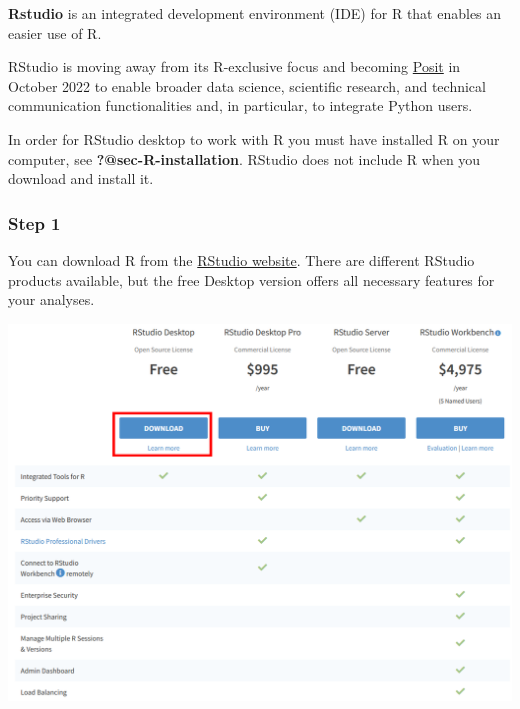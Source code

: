 \documentclass[
  letterpaper,
  DIV=11,
  numbers=noendperiod]{scrreprt}
\begin{document}
\textbf{Rstudio} is an integrated development environment (IDE) for R
that enables an easier use of R.

\begin{tcolorbox}[enhanced jigsaw, bottomtitle=1mm, title=\textcolor{quarto-callout-note-color}{\faInfo}\hspace{0.5em}{Note}, toptitle=1mm, toprule=.15mm, breakable, colframe=quarto-callout-note-color-frame, coltitle=black, rightrule=.15mm, arc=.35mm, left=2mm, opacitybacktitle=0.6, colback=white, colbacktitle=quarto-callout-note-color!10!white, bottomrule=.15mm, opacityback=0, titlerule=0mm, leftrule=.75mm]
RStudio is moving away from its R-exclusive focus and becoming
\href{https://posit.co/}{Posit} in October 2022 to enable broader data
science, scientific research, and technical communication
functionalities and, in particular, to integrate Python users.
\end{tcolorbox}

\begin{tcolorbox}[enhanced jigsaw, bottomtitle=1mm, title=\textcolor{quarto-callout-important-color}{\faExclamation}\hspace{0.5em}{Important}, toptitle=1mm, toprule=.15mm, breakable, colframe=quarto-callout-important-color-frame, coltitle=black, rightrule=.15mm, arc=.35mm, left=2mm, opacitybacktitle=0.6, colback=white, colbacktitle=quarto-callout-important-color!10!white, bottomrule=.15mm, opacityback=0, titlerule=0mm, leftrule=.75mm]
In order for RStudio desktop to work with R you must have installed R on
your computer, see \textbf{?@sec-R-installation}. RStudio does not
include R when you download and install it.
\end{tcolorbox}

\hypertarget{step-1-1}{%
\subsubsection{Step 1}\label{step-1-1}}

You can download R from the
\href{https://www.rstudio.com/products/rstudio/download/}{RStudio
website}. There are different RStudio products available, but the free
Desktop version offers all necessary features for your analyses.

\includegraphics{./images/paste-3C3D0718.png}
\end{document}
